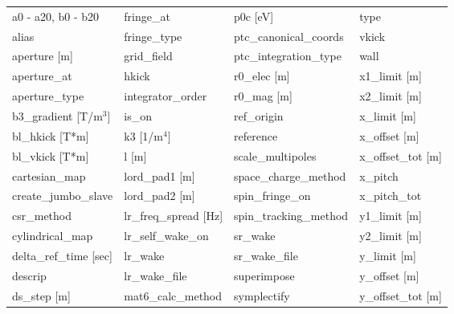  \begin{tabular}{llll} \toprule
a0 - a20, b0 - b20             & fringe_at                      & p0c [eV]                       & type                           \\
alias                          & fringe_type                    & ptc_canonical_coords           & vkick                          \\
aperture [m]                   & grid_field                     & ptc_integration_type           & wall                           \\
aperture_at                    & hkick                          & r0_elec [m]                    & x1_limit [m]                   \\
aperture_type                  & integrator_order               & r0_mag [m]                     & x2_limit [m]                   \\
b3_gradient [T/m$^3$]          & is_on                          & ref_origin                     & x_limit [m]                    \\
bl_hkick [T*m]                 & k3 [1/m$^4$]                   & reference                      & x_offset [m]                   \\
bl_vkick [T*m]                 & l [m]                          & scale_multipoles               & x_offset_tot [m]               \\
cartesian_map                  & lord_pad1 [m]                  & space_charge_method            & x_pitch                        \\
create_jumbo_slave             & lord_pad2 [m]                  & spin_fringe_on                 & x_pitch_tot                    \\
csr_method                     & lr_freq_spread [Hz]            & spin_tracking_method           & y1_limit [m]                   \\
cylindrical_map                & lr_self_wake_on                & sr_wake                        & y2_limit [m]                   \\
delta_ref_time [sec]           & lr_wake                        & sr_wake_file                   & y_limit [m]                    \\
descrip                        & lr_wake_file                   & superimpose                    & y_offset [m]                   \\
ds_step [m]                    & mat6_calc_method               & symplectify                    & y_offset_tot [m]               \\

\end{tabular}

